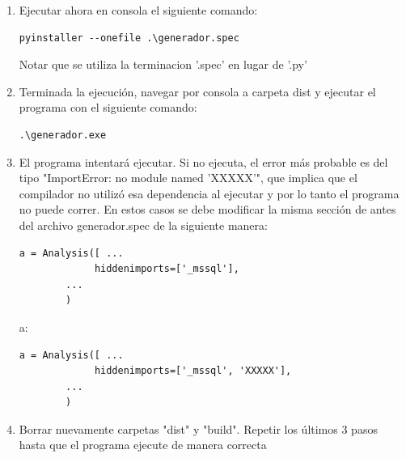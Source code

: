 \documentclass{article}
\begin{document}
\begin{enumerate}
\begin{lstlisting}
   return extra_datas
###########################################

# append the 'data' dir
a.datas += extra_datas('queries_generador')
\end{lstlisting}
\item Ejecutar ahora en consola el siguiente comando:
\begin{lstlisting}
pyinstaller --onefile .\generador.spec
\end{lstlisting}
Notar que se utiliza la terminacion '.spec' en lugar de '.py'

\item Terminada la ejecución, navegar por consola a carpeta dist y ejecutar el programa con el siguiente comando:
\begin{lstlisting}
.\generador.exe
\end{lstlisting}
\item El programa intentará ejecutar. Si no ejecuta, el error más probable es del tipo "ImportError: no module named 'XXXXX'", que implica que el compilador no utilizó esa dependencia al ejecutar y por lo tanto el programa no puede correr. En estos casos se debe modificar la misma sección de antes del archivo generador.spec de la siguiente manera:
\begin{lstlisting}
a = Analysis([ ...
             hiddenimports=['_mssql'],
 		...
 		)
\end{lstlisting}
a:
\begin{lstlisting}
a = Analysis([ ...
             hiddenimports=['_mssql', 'XXXXX'],
 		...
 		)
\end{lstlisting}
\item Borrar nuevamente carpetas "dist" y "build". Repetir los últimos 3 pasos hasta que el programa ejecute de manera correcta
\end{enumerate}
\end{document}
